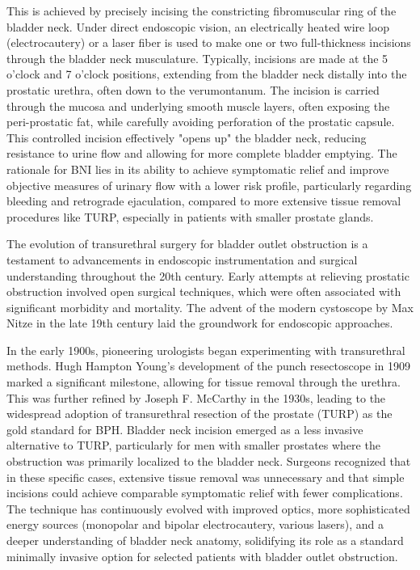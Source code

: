 This is achieved by precisely incising the constricting fibromuscular ring of the bladder neck. Under direct endoscopic vision, an electrically heated wire loop (electrocautery) or a laser fiber is used to make one or two full-thickness incisions through the bladder neck musculature. Typically, incisions are made at the 5 o'clock and 7 o'clock positions, extending from the bladder neck distally into the prostatic urethra, often down to the verumontanum. The incision is carried through the mucosa and underlying smooth muscle layers, often exposing the peri-prostatic fat, while carefully avoiding perforation of the prostatic capsule. This controlled incision effectively "opens up" the bladder neck, reducing resistance to urine flow and allowing for more complete bladder emptying. The rationale for BNI lies in its ability to achieve symptomatic relief and improve objective measures of urinary flow with a lower risk profile, particularly regarding bleeding and retrograde ejaculation, compared to more extensive tissue removal procedures like TURP, especially in patients with smaller prostate glands.

The evolution of transurethral surgery for bladder outlet obstruction is a testament to advancements in endoscopic instrumentation and surgical understanding throughout the 20th century. Early attempts at relieving prostatic obstruction involved open surgical techniques, which were often associated with significant morbidity and mortality. The advent of the modern cystoscope by Max Nitze in the late 19th century laid the groundwork for endoscopic approaches.

In the early 1900s, pioneering urologists began experimenting with transurethral methods. Hugh Hampton Young's development of the punch resectoscope in 1909 marked a significant milestone, allowing for tissue removal through the urethra. This was further refined by Joseph F. McCarthy in the 1930s, leading to the widespread adoption of transurethral resection of the prostate (TURP) as the gold standard for BPH. Bladder neck incision emerged as a less invasive alternative to TURP, particularly for men with smaller prostates where the obstruction was primarily localized to the bladder neck. Surgeons recognized that in these specific cases, extensive tissue removal was unnecessary and that simple incisions could achieve comparable symptomatic relief with fewer complications. The technique has continuously evolved with improved optics, more sophisticated energy sources (monopolar and bipolar electrocautery, various lasers), and a deeper understanding of bladder neck anatomy, solidifying its role as a standard minimally invasive option for selected patients with bladder outlet obstruction.

